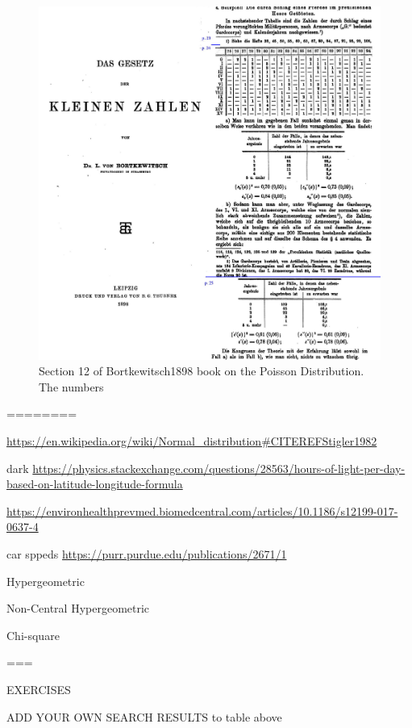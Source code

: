 \documentclass[]{book}
\begin{document}
\begin{figure}

{\centering \includegraphics[width=27.04in]{images/Bortkewitsch1898section12} 

}

\caption{Section 12 of Bortkewitsch1898 book on the Poisson Distribution. The numbers }\label{fig:unnamed-chunk-87}
\end{figure}

========

\url{https://en.wikipedia.org/wiki/Normal_distribution\#CITEREFStigler1982}

dark \url{https://physics.stackexchange.com/questions/28563/hours-of-light-per-day-based-on-latitude-longitude-formula}

\url{https://environhealthprevmed.biomedcentral.com/articles/10.1186/s12199-017-0637-4}

car sppeds \url{https://purr.purdue.edu/publications/2671/1}

Hypergeometric

Non-Central Hypergeometric

Chi-square

===

EXERCISES

ADD YOUR OWN SEARCH RESULTS to table above
\end{document}
